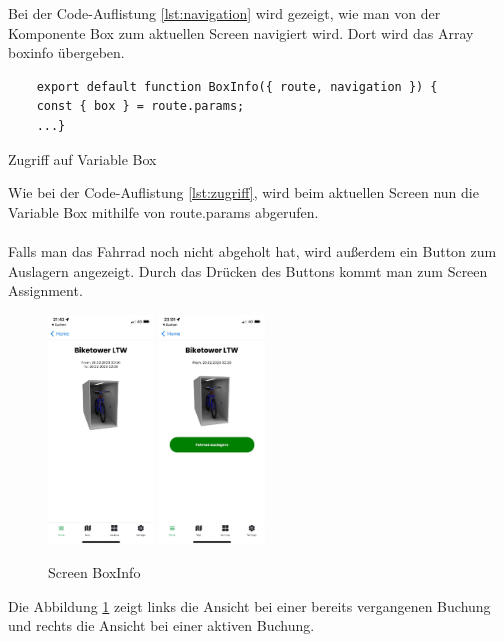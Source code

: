 Bei der Code-Auflistung \ref*{lst:navigation} wird gezeigt, wie man von der Komponente Box zum aktuellen Screen navigiert wird. Dort wird das \Gls{Array} boxinfo übergeben.\\
\begin{listing}[H]
  \begin{verbatim}
    export default function BoxInfo({ route, navigation }) {
    const { box } = route.params;
    ...}
\end{verbatim}
  \caption{Zugriff auf Variable Box}
  \label{lst:zugriff}
\end{listing}
Wie bei der Code-Auflistung \ref*{lst:zugriff}, wird beim aktuellen Screen nun die Variable Box mithilfe von route.params abgerufen. \\ \\
Falls man das Fahrrad noch nicht abgeholt hat, wird außerdem ein Button zum Auslagern angezeigt. Durch das Drücken des Buttons kommt man zum Screen Assignment.\\
\begin{figure}[H]
  \centering
  \includegraphics[width=0.25\textwidth]{images/app-screenshots/screenboxinfo.png}
  \includegraphics[width=0.25\textwidth]{images/app-screenshots/screenboxinfov.png}
  \caption{Screen BoxInfo}
  \label{fig:screenboxinfo}
\end{figure}
Die Abbildung \ref{fig:screenboxinfo} zeigt links die Ansicht bei einer bereits vergangenen Buchung und rechts die Ansicht bei einer aktiven Buchung.\\


